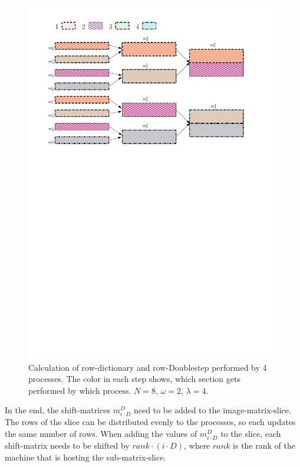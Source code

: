 \documentclass[12pt]{article}
\begin{document}
 \begin{figure}[H]
 	\begin{center}
 		\includegraphics[width=400pt]{processes_colum_doublestep}
 		\caption{Calculation of row-dictionary and row-Doublestep performed by 4 processes. The color in each step shows, which section gets performed by which process. $N=8$, $\omega = 2$, $\lambda=4$.}
 		\label{fig::rowDSprocesses}
 	\end{center}
 \end{figure}
 
In the end, the shift-matrices $m_{i\cdot D}^{D}$ need to be added to the image-matrix-slice. The rows of the slice can be distributed evenly to the processes, so each updates the same number of rows. When adding the values of $m_{i\cdot D}^{D}$ to the slice, each shift-matrix needs to be shifted by $rank\cdot (i\cdot D)$, where $rank$ is the rank of the machine that is hosting the sub-matrix-slice.\\
\end{document}
